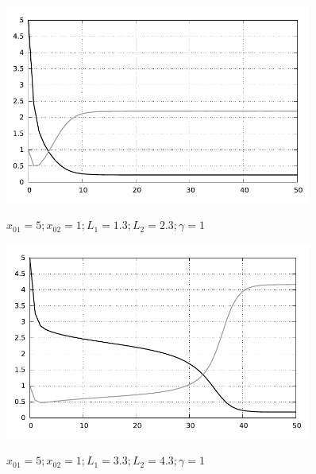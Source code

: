 \begin{figure}[h!]
    \center
    \includegraphics[width=0.9\textwidth]{images/graph_0003}
    \parbox{.8\textwidth}{ \centering
    \( x_{01} = 5; x_{02} = 1; L_1 = 1.3; L_2 = 2.3; \gamma = 1 \)}
    \includegraphics[width=0.9\textwidth]{images/graph_0004}
    \parbox{.8\textwidth}{ \centering
    \( x_{01} = 5; x_{02} = 1; L_1 = 3.3; L_2 = 4.3; \gamma = 1 \)}
\end{figure}
